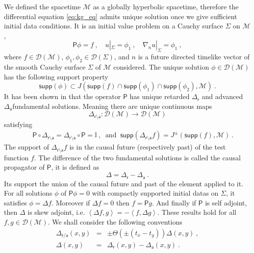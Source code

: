 \documentclass[12pt]{book}
\newcommand{\supp}{\mathsf{supp}}
\newcommand{\sm}[1]{\left\langle#1\right\rangle}
\newcommand{\Dcal}{\mathcal{D}}
\newcommand{\Mcal}{\mathcal{M}}
\newcommand{\Ibb}{\mathbb{I}}
\newcommand{\Psf}{\mathsf{P}}
\newcommand{\asf}{\mathsf{a}}
\newcommand{\rsf}{\mathsf{r}}
\theoremstyle{break}
\begin{document}


We defined the spacetime $\Mcal$ as a globally hyperbolic spacetime, therefore the differential equation \eqref{eq:kg_eq} admits unique solution once we give sufficient initial data conditions. It is an initial value problem on a Cauchy surface $\Sigma$ on $\Mcal$,
%
\begin{equation}
\Psf \phi = f \ , \quad u|_\Sigma = \phi_1 \ , \quad \nabla_n u |_\Sigma = \phi_1 \ ,
\label{eq:init_val_pb}
\end{equation}
%
where $f \in \Dcal(\Mcal)$, $\phi_1, \phi_2 \in \Dcal(\Sigma)$, and $n$ is a future directed timelike vector of the smooth Cauchy surface $\Sigma$ of $\Mcal$ considered. The unique solution $\phi \in \Dcal(\Mcal)$ has the following support property
%
\begin{equation*}
\supp(\phi) \subset J\left( \supp(f) \cap \supp(\phi_1) \cap \supp(\phi_2) , \Mcal \right) \ .
\end{equation*}
%
It has been shown in \cite{baer_wave_2008} that the operator $\Psf$ has unique retarded $\Delta_\rsf$ and advanced $\Delta_\asf$fundamental solutions. Meaning there are unique continuous maps 
%
\begin{equation*}
\Delta_{\rsf\setminus\asf} : \Dcal(\Mcal) \to \Dcal(\Mcal)  
\end{equation*}
%
satisfying 
%
\begin{eqnarray*}
&& \Psf \circ \Delta_{\rsf\setminus\asf} = \Delta_{\rsf\setminus\asf} \circ \Psf = \Ibb \ , \ \mbox{ and } \ \supp(\Delta_{\rsf\setminus\asf} f) = J^{\pm} \left(\supp(f) , \Mcal\right) \ .
\end{eqnarray*}
%
The support of $\Delta_{\mathsf{\rsf\setminus\asf}} f$ is in the causal future (respectively past) of the test function $f$. The difference of the two fundamental solutions is called the causal propagator of $\Psf$, it is defined as
%
\begin{equation*}
\Delta = \Delta_\rsf - \Delta_\asf \ .
\end{equation*}
%
Its support the union of the causal future and past of the element applied to it. For all solutions $\phi$ of $\Psf \phi =0$ with compactly supported initial datas on $\Sigma$, it satisfies $\phi = \Delta f$. Moreover if $\Delta f =0$ then $f = \Psf g$. And finally if $\Psf$ is self adjoint, then $\Delta$ is skew adjoint, i.e. $\sm{\Delta f,g} = - \sm{f,\Delta g}$. These results hold for all $f, g \in \Dcal(\Mcal)$. We shall consider the following conventions
%
\begin{eqnarray*}
\Delta_{\rsf/\asf}(x,y) &=& \pm \Theta(\pm(t_x-t_y)) \Delta(x,y) \ ,\\
\Delta(x,y) &=& \Delta_\rsf(x,y)-\Delta_\asf(x,y) \ .
\end{eqnarray*}
\end{document}
